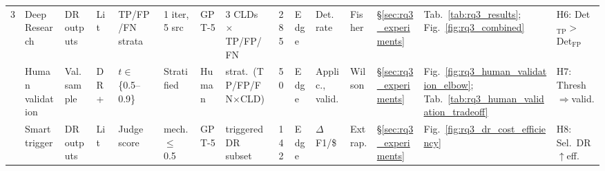 \begin{landscape}
\begin{table}[H]
{\begin{tabular}{@{}l l l l l l l l c l l l l l l@{}}
\midrule
\multirow{3}{*}{3}
  & Deep Research & DR outputs & Lit & TP/FP/FN strata & 1 iter, 5 src & GPT-5 & 3 CLDs $\times$ TP/FP/FN & 285 & Edge & Det.\ rate & Fisher & \S\ref{sec:rq3_experiments} & Tab.~\ref{tab:rq3_results}; Fig.~\ref{fig:rq3_combined} & H6: Det$_{\text{TP}}$$>$Det$_{\text{FP}}$ \\
  & Human validation & Val.\ sample & DR+ & $t\in$\{0.5--0.9\} & Stratified & Human & strat.\ (TP/FP/FN$\times$CLD) & 50 & Edge & Applic., valid. & Wilson & \S\ref{sec:rq3_experiments} & Fig.~\ref{fig:rq3_human_validation_elbow}; Tab.~\ref{tab:rq3_human_validation_tradeoff} & H7: Thresh$\Rightarrow$valid. \\
  & Smart trigger & DR outputs & Lit & Judge score & mech. $\leq$ 0.5 & GPT-5 & triggered DR subset & 142 & Edge & $\Delta$F1/\$ & Extrap. & \S\ref{sec:rq3_experiments} & Fig.~\ref{fig:rq3_dr_cost_efficiency} & H8: Sel.\ DR$\uparrow$eff. \\
\bottomrule
\end{tabular}}%


\end{table}
\end{landscape}
